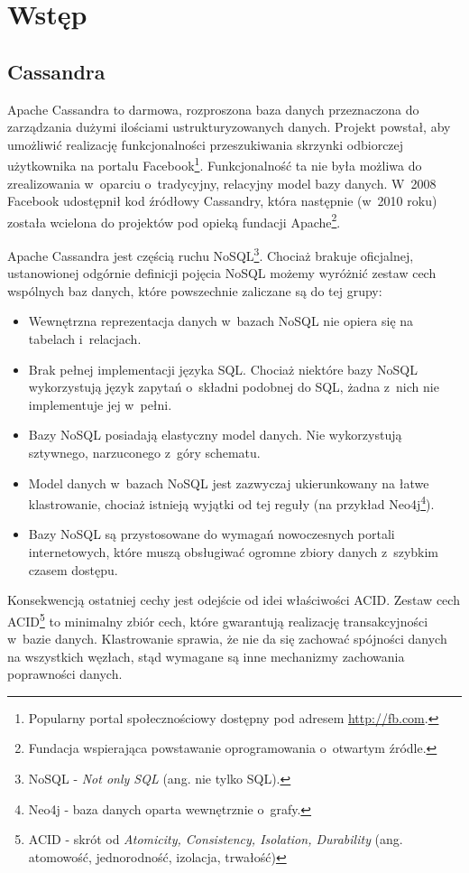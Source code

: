\chapter{Wstęp}

\section{Cassandra}

Apache Cassandra to darmowa, rozproszona baza danych przeznaczona do zarządzania dużymi ilościami ustrukturyzowanych danych. Projekt powstał, aby umożliwić realizację funkcjonalności przeszukiwania skrzynki odbiorczej użytkownika na portalu Facebook\footnote{Popularny portal społecznościowy dostępny pod adresem \url{http://fb.com}.}. Funkcjonalność ta nie była możliwa do zrealizowania w~oparciu o~tradycyjny, relacyjny model bazy danych. W~2008 Facebook udostępnił kod źródłowy Cassandry, która następnie (w~2010 roku) została wcielona do projektów pod opieką fundacji Apache\footnote{Fundacja wspierająca powstawanie oprogramowania o~otwartym źródle.}.\cite{casshistory} 

Apache Cassandra jest częścią ruchu NoSQL\footnote{NoSQL - \emph{Not only SQL} (ang. nie tylko SQL).}. Chociaż brakuje oficjalnej, ustanowionej odgórnie definicji pojęcia NoSQL możemy wyróżnić zestaw cech wspólnych baz danych, które powszechnie zaliczane są do tej grupy:

\begin{itemize}
	\item Wewnętrzna reprezentacja danych w~bazach NoSQL nie opiera się na tabelach i~relacjach.
	\item Brak pełnej implementacji języka SQL. Chociaż niektóre bazy NoSQL wykorzystują język zapytań o~składni podobnej do SQL, żadna z~nich nie implementuje jej w~pełni.
	\item Bazy NoSQL posiadają elastyczny model danych. Nie wykorzystują sztywnego, narzuconego z~góry schematu.
	\item Model danych w~bazach NoSQL jest zazwyczaj ukierunkowany na łatwe klastrowanie, chociaż istnieją wyjątki od tej reguły (na przykład Neo4j\footnote{Neo4j - baza danych oparta wewnętrznie o~grafy.}).
	\item Bazy NoSQL są przystosowane do wymagań nowoczesnych portali internetowych, które muszą obsługiwać ogromne zbiory danych z~szybkim czasem dostępu. \cite{nosqldistilled}
\end{itemize}

Konsekwencją ostatniej cechy jest odejście od idei właściwości ACID. Zestaw cech ACID\footnote{ACID - skrót od \emph{Atomicity, Consistency, Isolation, Durability} (ang. atomowość, jednorodność, izolacja, trwałość)} to minimalny zbiór cech, które gwarantują realizację transakcyjności w~bazie danych. \cite{transactionconcept} Klastrowanie sprawia, że nie da się zachować spójności danych na wszystkich węzłach, stąd wymagane są inne mechanizmy zachowania poprawności danych.

